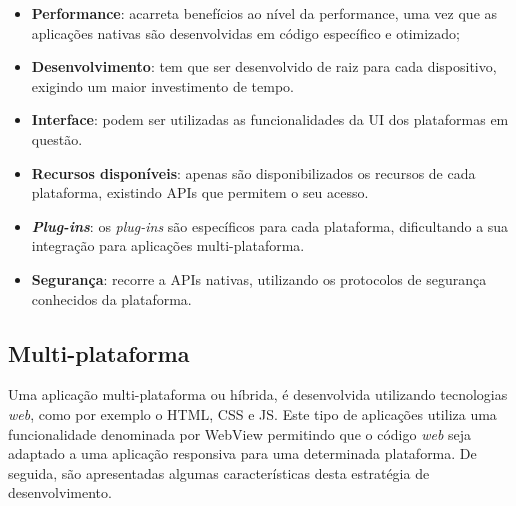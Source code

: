 \begin{itemize}
	\item \textbf{Performance}: acarreta benefícios ao nível da performance, uma vez que as aplicações nativas são desenvolvidas em código específico e otimizado; 

	
	
	\item \textbf{Desenvolvimento}: tem que ser desenvolvido de raiz para cada dispositivo, exigindo um maior investimento de tempo. 
	
	\item \textbf{Interface}: podem ser utilizadas as funcionalidades da \ac{UI} dos plataformas em questão. 
	
	
	\item \textbf{Recursos disponíveis}: apenas são disponibilizados os recursos de cada plataforma, existindo APIs que permitem o seu acesso. 
	
	

	\item \textbf{\textit{Plug-ins}}: os \textit{plug-ins} são específicos para cada plataforma, dificultando a sua integração para aplicações multi-plataforma. 
	
	
	\item \textbf{Segurança}: recorre a APIs nativas, utilizando os protocolos de segurança conhecidos da plataforma. 
	
	
\end{itemize}


\subsection{Multi-plataforma}



Uma aplicação multi-plataforma ou híbrida, é desenvolvida utilizando tecnologias \textit{web}, como por exemplo o \ac{HTML}, \ac{CSS} e \ac{JS}. Este tipo de aplicações utiliza uma funcionalidade denominada por WebView permitindo que o código \textit{web} seja adaptado a uma aplicação responsiva para uma determinada plataforma. De seguida, são apresentadas algumas características desta estratégia de desenvolvimento\cite{Ibm2012a}. 







